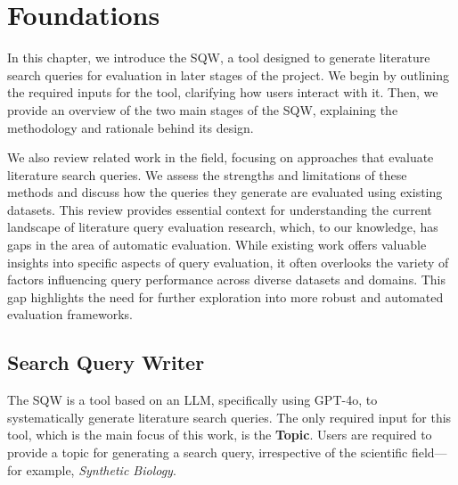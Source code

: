 {\let\clearpage\relax \chapter{Foundations}\label{ch:foundations}}
In this chapter, we introduce the SQW, a tool designed to generate literature search queries for evaluation in later stages of the project. We begin by outlining the required inputs for the tool, clarifying how users interact with it. Then, we provide an overview of the two main stages of the SQW, explaining the methodology and rationale behind its design.

We also review related work in the field, focusing on approaches that evaluate literature search queries. We assess the strengths and limitations of these methods and discuss how the queries they generate are evaluated using existing datasets. This review provides essential context for understanding the current landscape of literature query evaluation research, which, to our knowledge, has gaps in the area of automatic evaluation. While existing work offers valuable insights into specific aspects of query evaluation, it often overlooks the variety of factors influencing query performance across diverse datasets and domains. This gap highlights the need for further exploration into more robust and automated evaluation frameworks.

\section{Search Query Writer}\label{sec:sqw}
The SQW is a tool based on an LLM, specifically using GPT-4o, to systematically generate literature search queries. The only required input for this tool, which is the main focus of this work, is the \textbf{Topic}. Users are required to provide a topic for generating a search query, irrespective of the scientific field—for example, \textit{Synthetic Biology}. 

